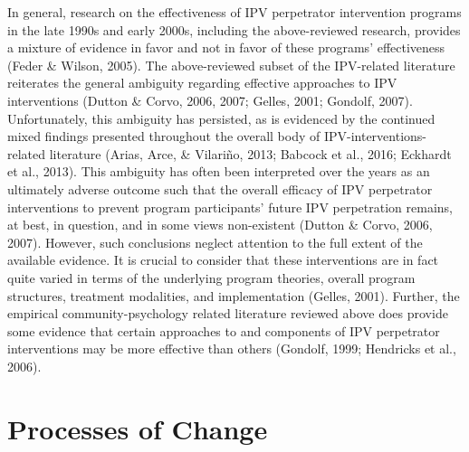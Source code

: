 \documentclass[11pt,]{tufte-book}
\begin{document}
In general, research on the effectiveness of IPV perpetrator
intervention programs in the late 1990s and early 2000s, including the
above-reviewed research, provides a mixture of evidence in favor and not
in favor of these programs' effectiveness (Feder \& Wilson, 2005). The
above-reviewed subset of the IPV-related literature reiterates the
general ambiguity regarding effective approaches to IPV interventions
(Dutton \& Corvo, 2006, 2007; Gelles, 2001; Gondolf, 2007).
Unfortunately, this ambiguity has persisted, as is evidenced by the
continued mixed findings presented throughout the overall body of
IPV-interventions-related literature (Arias, Arce, \& Vilariño, 2013;
Babcock et al., 2016; Eckhardt et al., 2013). This ambiguity has often
been interpreted over the years as an ultimately adverse outcome such
that the overall efficacy of IPV perpetrator interventions to prevent
program participants' future IPV perpetration remains, at best, in
question, and in some views non-existent (Dutton \& Corvo, 2006, 2007).
However, such conclusions neglect attention to the full extent of the
available evidence. It is crucial to consider that these interventions
are in fact quite varied in terms of the underlying program theories,
overall program structures, treatment modalities, and implementation
(Gelles, 2001). Further, the empirical community-psychology related
literature reviewed above does provide some evidence that certain
approaches to and components of IPV perpetrator interventions may be
more effective than others (Gondolf, 1999; Hendricks et al., 2006).

\section{Processes of Change}\label{processes-of-change}
\end{document}
